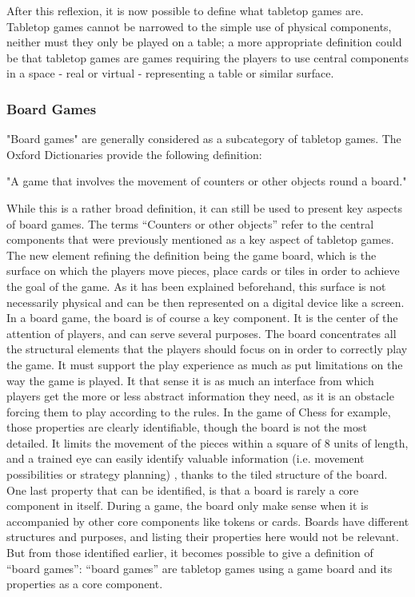 After this reflexion, it is now possible to define what tabletop games are. Tabletop games cannot be narrowed to the simple use of physical components, neither must they only be played on a table; a more appropriate definition could be that tabletop games are games requiring the players to use central components in a space - real or virtual - representing a table or similar surface.

\subsubsection{Board Games}

"Board games" are generally considered as a subcategory of tabletop games. The Oxford Dictionaries provide the following definition:

"A game that involves the movement of counters or other objects round a board."

While this is a rather broad definition, it can still be used to present key aspects of board games. The terms “Counters or other objects” refer to the central components that were previously mentioned as a key aspect of tabletop games. The new element refining the definition being the game board, which is the surface on which the players move pieces, place cards or tiles in order to achieve the goal of the game. As it has been explained beforehand, this surface is not necessarily physical and can be then represented on a digital device like a screen. In a board game, the board is of course a key component. It is the center of the attention of players, and can serve several purposes. 
The board concentrates all the structural elements that the players should focus on in order to correctly play the game. It must support the play experience as much as put limitations on the way the game is played. It that sense it is as much an interface from which players get the more or less abstract information they need, as it is an obstacle forcing them to play according to the rules. In the game of Chess for example, those properties are clearly identifiable, though the board is not the most detailed. It limits the movement of the pieces within a square of 8 units of length, and a trained eye can easily identify valuable information (i.e. movement possibilities or strategy planning) , thanks to the tiled structure of the board. One last property that can be identified, is that a board is rarely a core component in itself. During a game, the board only make sense when it is accompanied by other core components like tokens or cards. Boards have different structures and purposes, and listing their properties here would not be relevant. But from those identified earlier, it becomes possible to give a definition of “board games”: “board games” are tabletop games using a game board and its properties as a core component.


